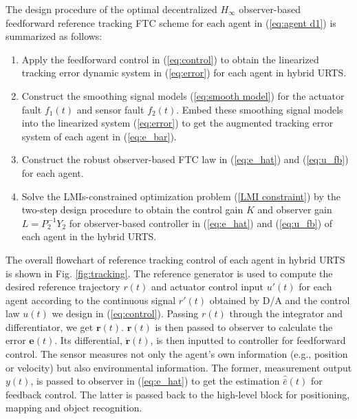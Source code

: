 \documentclass[journal,12pt,onecolumn,draftclsnofoot,]{IEEEtran}
\begin{document}
The design procedure of the optimal decentralized $H_\infty$ observer-based feedforward reference tracking FTC scheme for each agent in (\ref{eq:agent d1}) is summarized as follows:
\begin{enumerate}
    \item Apply the feedforward control in (\ref{eq:control}) to obtain the linearized tracking error dynamic system in (\ref{eq:error}) for each agent in hybrid URTS.
    \item Construct the smoothing signal models (\ref{eq:smooth model}) for the actuator fault $f_1(t)$ and sensor fault $f_2(t)$. Embed these smoothing signal models into the linearized system (\ref{eq:error}) to get the augmented tracking error system of each agent in (\ref{eq:e_bar}).
    \item Construct the robust observer-based FTC law in (\ref{eq:e_hat}) and (\ref{eq:u_fb}) for each agent.
    \item Solve the LMIs-constrained optimization problem (\ref{LMI constraint}) by the two-step design procedure to obtain the control gain $K$ and observer gain $L=P_2^{-1}Y_2$ for observer-based controller in (\ref{eq:e_hat}) and (\ref{eq:u_fb}) of each agent in the hybrid URTS.
\end{enumerate}

The overall flowchart of reference tracking control of each agent in hybrid URTS is shown in Fig. \ref{fig:tracking}. The reference generator is used to compute the desired reference trajectory $r(t)$ and actuator control input $u'(t)$ for each agent according to the continuous signal $r'(t)$ obtained by D/A and the control law $u(t)$ we design in (\ref{eq:control}). Passing $r(t)$ through the integrator and differentiator, we get $\pmb{r}(t)$. $\pmb{r}(t)$ is then passed to observer to calculate the error $\pmb{e}(t)$. Its differential, $\dot{\pmb{r}}(t)$, is then inputted to controller for feedforward control. The sensor measures not only the agent's own information (e.g., position or velocity) but also environmental information. The former, measurement output $y(t)$, is passed to observer in (\ref{eq:e_hat}) to get the estimation $\hat{\bar{e}}(t)$ for feedback control. The latter is passed back to the high-level block for positioning, mapping and object recognition.
\end{document}
